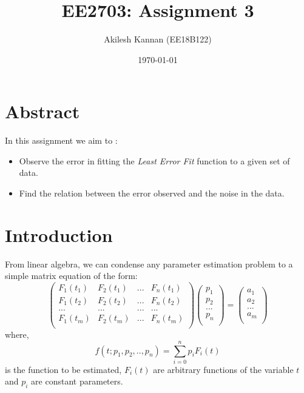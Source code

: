 \documentclass[11pt, a4paper]{article}
\title{EE2703: Assignment 3} %
\author{Akilesh Kannan (EE18B122)} %
\date{\today} %
\begin{document}
    \maketitle %

    \section{Abstract}
        In this assignment we aim to :
        \begin{itemize}
            \item Observe the error in fitting the \textit{Least Error Fit} function to a given set of data.
            \item Find the relation between the error observed and the noise in the data.
        \end{itemize}
    \section{Introduction}
        From linear algebra, we can condense any parameter estimation problem to a simple matrix equation of the form:
        \begin{equation}
            \left(\begin{matrix}
            F_1(t_1) & F_2(t_1) & ... & F_n(t_1)\\
            F_1(t_2) & F_2(t_2) & ... & F_n(t_2)\\
            ... & ... & ... & ...\\
            F_1(t_m) & F_2(t_m) & ... & F_n(t_m)\\
            \end{matrix}\right)
            \left(\begin{matrix}
            p_1\\
            p_2\\
            ...\\
            p_n\\
            \end{matrix}\right)
            =
            \left(\begin{matrix}
            a_1\\
            a_2\\
            ...\\
            a_m\\
            \end{matrix}\right)
            \label{eq0}
        \end{equation}
        where,
        \begin{equation}
            f(t;p_1, p_2,..,p_n) = \sum_{i=0}^{n}p_iF_i(t)
        \end{equation}
        is the function to be estimated, $F_i(t)$ are arbitrary functions of the variable $t$ and $p_i$ are constant parameters.\\
\end{document}

